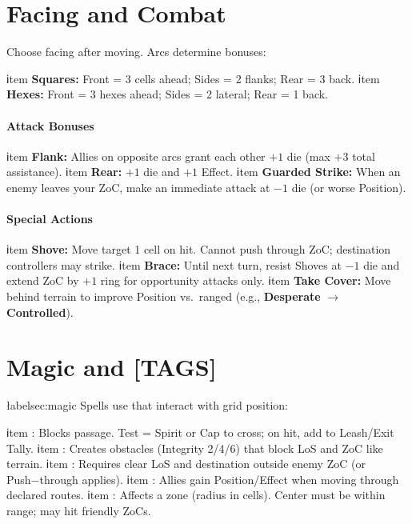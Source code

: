 \documentclass[11pt]{article}
\begin{document}
\section{Facing and Combat}
Choose facing after moving. Arcs determine bonuses:
\begin{itemize}
  ℹtem \textbf{Squares:} Front = 3 cells ahead; Sides = 2 flanks; Rear = 3 back.
  ℹtem \textbf{Hexes:} Front = 3 hexes ahead; Sides = 2 lateral; Rear = 1 back.
\end{itemize}

\paragraph{Attack Bonuses}
\begin{itemize}
  ℹtem \textbf{Flank:} Allies on opposite arcs grant each other $+1$ die (max $+3$ total assistance).
  ℹtem \textbf{Rear:} $+1$ die and $+1$ Effect.
  ℹtem \textbf{Guarded Strike:} When an enemy leaves your ZoC, make an immediate attack at $−1$ die (or worse Position).
\end{itemize}

\paragraph{Special Actions}
\begin{itemize}
  ℹtem \textbf{Shove:} Move target 1 cell on hit. Cannot push through ZoC; destination controllers may strike.
  ℹtem \textbf{Brace:} Until next turn, resist Shoves at $−1$ die and extend ZoC by $+1$ ring for opportunity attacks only.
  ℹtem \textbf{Take Cover:} Move behind terrain to improve Position vs.\ ranged (e.g., \textbf{Desperate} $→$ \textbf{Controlled}).
\end{itemize}

\section{Magic and [TAGS]}łabel{sec:magic}
Spells use \Tags{} that interact with grid position:

\begin{itemize}
  ℹtem : Blocks passage. Test \DV{} = Spirit or Cap to cross; on hit, add \DV{} to Leash/Exit Tally.
  ℹtem : Creates obstacles (Integrity 2/4/6) that block LoS and ZoC like terrain.
  ℹtem : Requires clear LoS and destination outside enemy ZoC (or Push−through applies).
  ℹtem : Allies gain Position/Effect when moving through declared routes.
  ℹtem : Affects a zone (radius in cells). Center must be within range; may hit friendly ZoCs.
\end{itemize}
\end{document}
